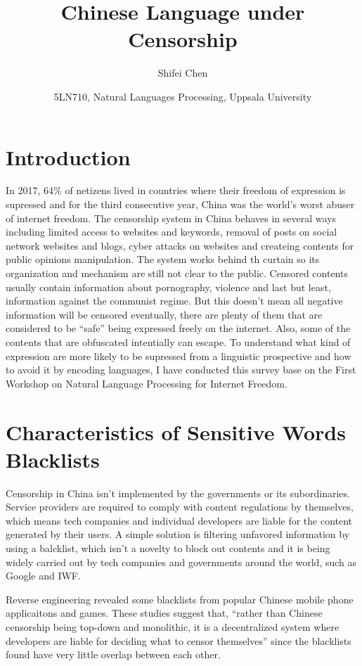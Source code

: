 \documentclass[11pt]{article} %
\title{{\LARGE Chinese Language under Censorship}\\[1.5mm]} %
\author{Shifei Chen\\} %
\date{5LN710, Natural Languages Processing, Uppsala University}
\begin{document}
\maketitle

\section{Introduction}

In 2017, 64\% of netizens lived in countries where their freedom of expression is supressed and for the third consecutive year, China was the world's worst abuser of internet freedom\cite{BibEntry2017Oct}. The censorship system in China behaves in several ways including limited access to websites and keywords, removal of posts on social network websites and blogs, cyber attacks on websites and createing contents for public opinions manipulation. The system works behind th curtain so its organization and mechanism are still not clear to the public. Censored contents usually contain information about pornography, violence and last but least, information against the communist regime. But this doesn't mean all negative information will be censored eventually, there are plenty of them that are considered to be ``safe'' being expressed freely on the internet. Also, some of the contents that are obfuscated intentially can escape. To understand what kind of expression are more likely to be supressed from a linguistic prospective and how to avoid it by encoding languages, I have conducted this survey base on the First Workshop on Natural Language Processing for Internet Freedom\cite{brew2018proceedings}.

\section{Characteristics of Sensitive Words Blacklists}

Censorship in China isn't implemented by the governments or its subordinaries. Service providers are required to comply with content regulations by themselves, which means tech companies and individual developers are liable for the content generated by their users. A simple solution is filtering unfavored information by using a balcklist, which isn't a novelty to block out contents and it is being widely carried out by tech companies and governments around the world, such as Google\cite{BibEntry2019Jan} and IWF\cite{BibEntry2013Jul}.

Reverse engineering revealed some blacklists from popular Chinese mobile phone applicaitons\cite{knockel2011three}\cite{knockel2015every} and games\cite{knockel2017measuring}. These studies suggest that, ``rather than Chinese censorship being top-down and monolithic, it is a decentralized system where developers are liable for deciding what to censor themselves''\cite{knockel2018effect} since the blacklists found have very little overlap between each other.
\end{document}
